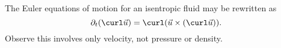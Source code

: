 \begin{node}
\begin{theorem}\label{fluids:euler-flow-000K}%
The Euler equations of motion for an isentropic fluid may be rewritten
as
\begin{equation*}
\partial_{t}(\curl\vec{u})=\curl(\vec{u}\times(\curl\vec{u})).
\end{equation*}
Observe this involves only velocity, not pressure or density.
\end{theorem} %
\end{node} %

